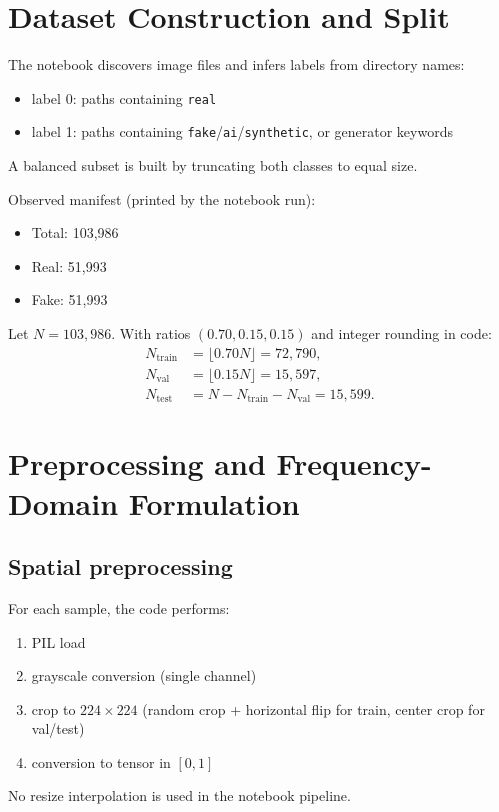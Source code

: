 \documentclass[conference]{IEEEtran}
\begin{document}
\section{Dataset Construction and Split}
The notebook discovers image files and infers labels from directory names:
\begin{itemize}
    \item label 0: paths containing \texttt{real}
    \item label 1: paths containing \texttt{fake}/\texttt{ai}/\texttt{synthetic}, or generator keywords
\end{itemize}
A balanced subset is built by truncating both classes to equal size.

Observed manifest (printed by the notebook run):
\begin{itemize}
    \item Total: 103{,}986
    \item Real: 51{,}993
    \item Fake: 51{,}993
\end{itemize}

Let $N=103{,}986$. With ratios $(0.70,0.15,0.15)$ and integer rounding in code:
\begin{align}
N_{\text{train}} &= \lfloor 0.70N \rfloor = 72{,}790, \\
N_{\text{val}}   &= \lfloor 0.15N \rfloor = 15{,}597, \\
N_{\text{test}}  &= N - N_{\text{train}} - N_{\text{val}} = 15{,}599.
\end{align}

\section{Preprocessing and Frequency-Domain Formulation}
\subsection{Spatial preprocessing}
For each sample, the code performs:
\begin{enumerate}
    \item PIL load
    \item grayscale conversion (single channel)
    \item crop to $224\times224$ (random crop + horizontal flip for train, center crop for val/test)
    \item conversion to tensor in $[0,1]$
\end{enumerate}
No resize interpolation is used in the notebook pipeline.
\end{document}
